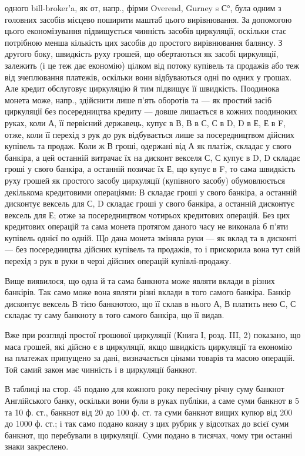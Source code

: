 \parcont{}  %
одного bill-broker’a, як от, напр., фірми Overend, Gurney s С°, була одним з головних
засобів місцево поширити маштаб цього вирівнювання. За допомогою
цього економізування підвищується чинність засобів циркуляції, оскільки стає
потрібною менша кількість цих засобів до простого вирівнювання балянсу.
З другого боку, швидкість руху грошей, що обертаються як засобі циркуляції, залежить
(і це теж дає економію) цілком від потоку купівель та продажів або теж
від зчеплювання платежів, оскільки вони відбуваються одні по одних у грошах.
Але кредит обслуговує циркуляцію й тим підвищує її швидкість. Поодинока монета
може, напр., здійснити лише п’ять оборотів та — як простий засіб циркуляції
без посередництва кредиту — довше лишається в кожних поодиноких руках,
коли А, її первісний державець, купує в В, В в С, С в D, D в Е, Е в F, отже,
коли її перехід з рук до рук відбувається лише за посередництвом дійсних купівель
та продаж. Коли ж В гроші, одержані від А як платіж, складає у свого
банкіра, а цей останній витрачає їх на дисконт векселя С, С купує в D, D складає
гроші у свого банкіра, а останній позичає їх Е, що купує в F, то сама
швидкість руху грошей як простого засобу циркуляції (купівного засобу) обумовлюється декількома
кредитовими операціями: В складає гроші у свого банкіра,
а останній дисконтує вексель для С, D складає гроші у свого банкіра, а останній
дисконтує вексель для Е; отже за посередництвом чотирьох кредитових операцій.
Без цих кредитових операцій та сама монета протягом даного часу не виконала
б п’яти купівель однієї по одній. Що дана монета зміняла руки — як вклад та
в дисконті — без посередництва дійсних купівель та продажів, то і прискорила
вона тут свій перехід з рук в руки в черзі дійсних операцій купівлі-продажу.

Вище виявилося, що одна й та сама банкнота може являти вклади в
різних банкірів. Так само може вона являти різні вклади в того самого банкіра.
Банкір дисконтує вексель В тією банкнотою, що її склав в нього А, В платить
нею С, С складає ту саму банкноту в того самого банкіра, що її видав.

Вже при розгляді простої грошової циркуляції (Книга І, розд. III, 2) показано,
що маса грошей, які дійсно є в циркуляції, якщо швидкість циркуляції
та економію на платежах припущено за дані, визначається цінами товарів та
масою операцій. Той самий закон має чинність і в циркуляції банкнот.

В таблиці на стор. 45 подано для кожного року пересічну річну суму банкнот
Англійського банку, оскільки вони були в руках публіки, а саме суми банкнот
в 5 та 10 ф. ст., банкнот від 20 до 100 ф. ст. та суми банкнот вищих купюр від
200 до 1000 ф. ст.; і так само подано кожну з цих рубрик у відсотках до
всієї суми банкнот, що перебували в циркуляції. Суми подано в тисячах, чому
три останні знаки закреслено.

